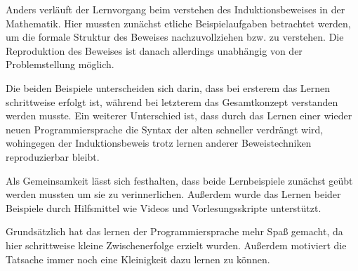 Anders verläuft der Lernvorgang beim verstehen des Induktionsbeweises in der Mathematik.
Hier mussten zunächst etliche Beispielaufgaben betrachtet werden, um die formale Struktur des Beweises nachzuvollziehen bzw. zu verstehen. Die Reproduktion des Beweises ist danach allerdings unabhängig von der Problemstellung möglich.

Die beiden Beispiele unterscheiden sich darin, dass bei ersterem das Lernen schrittweise erfolgt ist, während bei letzterem das Gesamtkonzept verstanden werden musste. Ein weiterer Unterschied ist, dass durch das Lernen einer wieder neuen Programmiersprache die Syntax der alten schneller verdrängt wird, wohingegen der Induktionsbeweis trotz lernen anderer Beweistechniken reproduzierbar bleibt.

Als Gemeinsamkeit lässt sich festhalten, dass beide Lernbeispiele zunächst geübt werden mussten um sie zu verinnerlichen. Außerdem wurde das Lernen beider Beispiele durch Hilfsmittel wie Videos und Vorlesungsskripte unterstützt.

Grundsätzlich hat das lernen der Programmiersprache mehr Spaß gemacht, da hier schrittweise kleine Zwischenerfolge erzielt wurden. Außerdem motiviert die Tatsache immer noch eine Kleinigkeit dazu lernen zu können.
